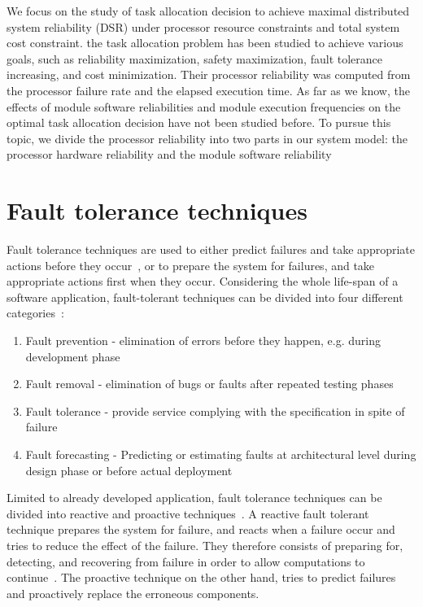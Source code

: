 \documentclass{cslthse-msc}
\begin{document}
We focus on the study of task allocation decision to achieve maximal distributed system reliability (DSR) under processor resource constraints and total system cost constraint. the task allocation problem has been studied to achieve various goals, such as reliability maximization, safety maximization, fault tolerance increasing, and cost minimization. Their processor reliability was computed from the processor failure rate and the elapsed execution time. As far as we know, the effects of module software reliabilities and module execution frequencies on the optimal task allocation decision have not been studied before. To pursue this topic, we divide the processor reliability into two parts in our system model: the processor hardware reliability and the module software reliability \cite{decisionModelTaskAllocation}
\fi

\section{Fault tolerance techniques} \label{sec:background_fault_tol_tech}
Fault tolerance techniques are used to either predict failures and take appropriate actions before they occur~\cite{faultToleranceChallenges}, or to prepare the system for failures, and take appropriate actions first when they occur. Considering the whole life-span of a software application, fault-tolerant techniques can be divided into four different categories~\cite{surveyReliabilityDistr}:

\begin{enumerate}
\item Fault prevention - elimination of errors before they happen, e.g. during development phase
\item Fault removal - elimination of bugs or faults after repeated testing phases
\item Fault tolerance - provide service complying with the specification in spite of failure
\item Fault forecasting - Predicting or estimating faults at architectural level during design phase or before actual deployment
\end{enumerate}

Limited to already developed application, fault tolerance techniques can be divided into reactive and proactive techniques~\cite{faultToleranceChallenges}. A reactive fault tolerant technique prepares the system for failure, and reacts when a failure occur and tries to reduce the effect of the failure. They therefore consists of preparing for, detecting, and recovering from failure in order to allow computations to continue~\cite{relGridSystems}. The proactive technique on the other hand, tries to predict failures and proactively replace the erroneous components.
\end{document}
